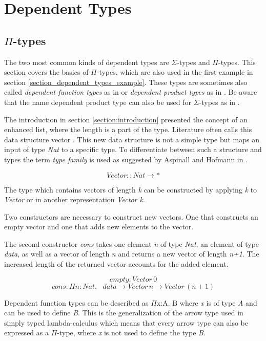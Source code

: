 \section{Dependent Types}\label{section:dependent_types}
\subsection{$\Pi$-types}
The two most common kinds of dependent types are $\Sigma$-types and $\Pi$-types.
This section covers the basics of $\Pi$-types, which are also used in the first example in section \ref{section_dependent_types_example}. 
These types are sometimes also called \emph{dependent function types} as in \cite{10.1145/2841316} or \emph{dependent product types} as in \cite{10.5555/1076265}. 
Be aware that the name dependent product type can also be used for $\Sigma$-types as in \cite{10.1145/2841316}.

The introduction in section \ref{section:introduction} presented the concept of an enhanced list, where the length is a part of the type.
Literature often calls this data structure vector \cite{10.1145/2841316} \cite{10.5555/1076265}.
This new data structure is not a simple type but maps an input of type \emph{Nat} to a specific type. 
To differentiate between such a structure and types the term \emph{type family} is used as suggested by Aspinall and Hofmann in \cite{10.5555/1076265}.

$$Vector :: Nat \rightarrow *$$

The type which contains vectors of length \emph{k} can be constructed by applying \emph{k} to \emph{Vector} or in another representation \emph{Vector k}.

Two constructors are necessary to construct new vectors.
One that constructs an empty vector and one that adds new elements to the vector.

The second constructor \emph{cons} takes one element \emph{n} of type \emph{Nat}, an element of type \emph{data}, as well as a vector of length \emph{n} and returns a new vector of length \emph{n+1}. 
The increased length of the returned vector accounts for the added element.

$$empty: Vector \, 0$$
$$cons : \Pi n : Nat. \, \text{ } data \rightarrow Vector \, n \rightarrow Vector \, (n+1)$$

Dependent function types can be described as $\Pi \text{x:A. B}$ where \emph{x} is of type \emph{A} and can be used to define \emph{B}. 
This is the generalization of the arrow type used in simply typed lambda-calculus which means that every arrow type can also be expressed as a $\Pi$-type, where \emph{x} is not used to define the type \emph{B}.

